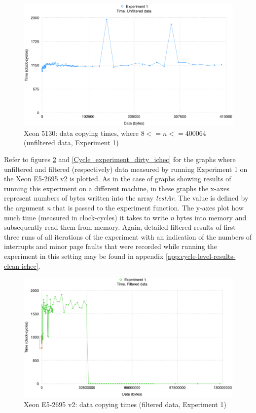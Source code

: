\begin{figure}[!htb]
\centering
\includegraphics[width=145mm]{6/Cycle_experiment_dirty_nuim_small.png}
\caption{Xeon 5130: data copying times, where $8<= n <= 400064$ (unfiltered data, Experiment 1)}
\label{Cycle_experiment_dirty_nuim_small}
\end{figure}

Refer to figures \ref{Cycle_experiment_clean_ichec} and \ref{Cycle_experiment_dirty_ichec} for the graphs where unfiltered and filtered (respectively) data measured by running Experiment 1 on the Xeon E5-2695 v2 is plotted. As in the case of graphs showing results of running this experiment on a different machine, in these graphs the x-axes represent numbers of bytes written into the array \textit{testAr}. The value is defined by the argument \textit{n} that is passed to the experiment function. The y-axes plot how much time (measured in clock-cycles) it takes to write \textit{n} bytes into memory and subsequently read them from memory. Again, detailed filtered results of first three runs of all iterations of the experiment with an indication of the numbers of interrupts and minor page faults that were recorded while running the experiment in this setting may be found in appendix \ref{app:cycle-level-results-clean-ichec}.

\begin{figure}[!htb]
\centering
\includegraphics[width=145mm]{6/Cycle_experiment_clean_ichec.png}
\caption{Xeon E5-2695 v2: data copying times (filtered data, Experiment 1)}
\label{Cycle_experiment_clean_ichec}
\end{figure}

